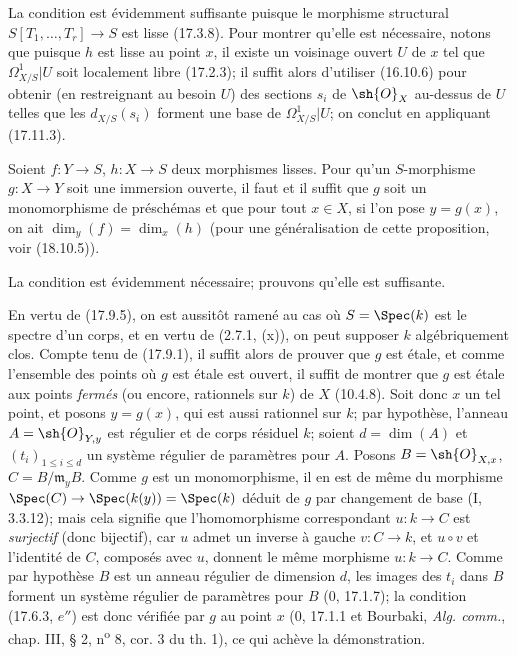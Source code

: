 
La condition est évidemment suffisante puisque le morphisme structural $S[T_1,\ldots,T_r]\to S$ est lisse (17.3.8). Pour montrer qu'elle est nécessaire, notons que puisque $h$ est lisse au point $x$, il existe un voisinage ouvert $U$ de $x$ tel que $\Omega^1_{X/S}|U$ soit localement libre (17.2.3); il suffit alors d'utiliser (16.10.6) pour obtenir (en restreignant au besoin $U$) des sections $s_i$ de $\sh{O}_X$ au-dessus de $U$ telles que les $d_{X/S}(s_i)$ forment une base de $\Omega^1_{X/S}|U$; on conclut en appliquant (17.11.3).

\begin{proposition}[17.11.5]
\label{IV.17.11.5}
Soient $f:Y\to S$, $h:X\to S$ deux morphismes lisses. Pour qu'un $S$-morphisme $g:X\to Y$ soit une immersion ouverte, il faut et il suffit que $g$ soit un monomorphisme de préschémas et que pour tout $x\in X$, si l'on pose $y=g(x)$, on ait $\dim_y(f)=\dim_x(h)$ (pour une généralisation de cette proposition, voir (18.10.5)).
\end{proposition}

La condition est évidemment nécessaire; prouvons qu'elle est suffisante.

En vertu de (17.9.5), on est aussitôt ramené au cas où $S=\Spec(k)$ est le spectre d'un corps, et en vertu de (2.7.1, (x)), on peut supposer $k$ algébriquement clos. Compte tenu de (17.9.1), il suffit alors de prouver que $g$ est étale, et comme l'ensemble des points où $g$ est étale est ouvert, il suffit de montrer que $g$ est étale aux points \emph{fermés} (ou encore, rationnels sur $k$) de $X$ (10.4.8). Soit donc $x$ un tel point, et posons $y=g(x)$, qui est aussi rationnel sur $k$; par hypothèse, l'anneau $A=\sh{O}_{Y,y}$ est régulier et de corps résiduel $k$; soient $d=\dim(A)$ et $(t_i)_{1\leq i\leq d}$ un système régulier de paramètres pour $A$. Posons $B=\sh{O}_{X,x}$, $C=B/\mathfrak m_yB$. Comme $g$ est un monomorphisme, il en est de même du morphisme $\Spec(C)\to\Spec(k(y))=\Spec(k)$ déduit de $g$ par changement de base (I, 3.3.12); mais cela signifie que l'homomorphisme correspondant $u:k\to C$ est \emph{surjectif} (donc bijectif), car $u$ admet un inverse à gauche $v:C\to k$, et $u\circ v$ et l'identité de $C$, composés avec $u$, donnent le même morphisme $u:k\to C$. Comme par hypothèse $B$ est un anneau régulier de dimension $d$, les images des $t_i$ dans $B$ forment un système régulier de paramètres pour $B$ (0, 17.1.7); la condition (17.6.3, $e''$) est donc vérifiée par $g$ au point $x$ (0, 17.1.1 et Bourbaki, \emph{Alg. comm.}, chap. III, § 2, n\textsuperscript{o} 8, cor. 3 du th. 1), ce qui achève la démonstration.

